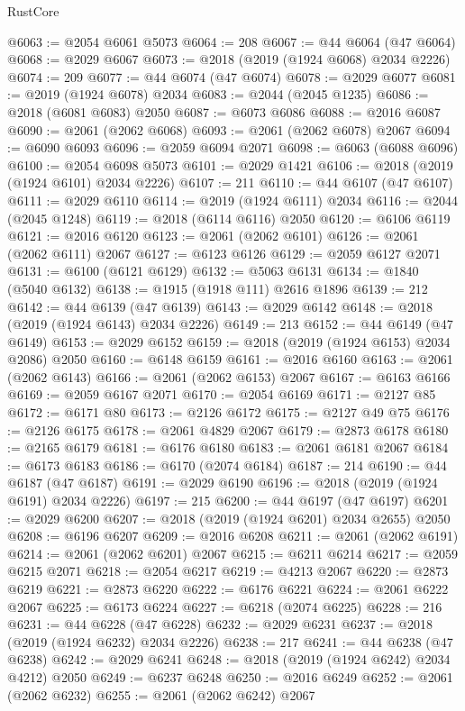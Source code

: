 \begin{lexlean}{RustCore}
\begin{coremodule}
@6063 := @2054 @6061 @5073
@6064 := 208
@6067 := @44 @6064 (@47 @6064)
@6068 := @2029 @6067
@6073 := @2018 (@2019 (@1924 @6068) @2034 @2226)
@6074 := 209
@6077 := @44 @6074 (@47 @6074)
@6078 := @2029 @6077
@6081 := @2019 (@1924 @6078) @2034
@6083 := @2044 (@2045 @1235)
@6086 := @2018 (@6081 @6083) @2050
@6087 := @6073 @6086
@6088 := @2016 @6087
@6090 := @2061 (@2062 @6068)
@6093 := @2061 (@2062 @6078) @2067
@6094 := @6090 @6093
@6096 := @2059 @6094 @2071
@6098 := @6063 (@6088 @6096)
@6100 := @2054 @6098 @5073
@6101 := @2029 @1421
@6106 := @2018 (@2019 (@1924 @6101) @2034 @2226)
@6107 := 211
@6110 := @44 @6107 (@47 @6107)
@6111 := @2029 @6110
@6114 := @2019 (@1924 @6111) @2034
@6116 := @2044 (@2045 @1248)
@6119 := @2018 (@6114 @6116) @2050
@6120 := @6106 @6119
@6121 := @2016 @6120
@6123 := @2061 (@2062 @6101)
@6126 := @2061 (@2062 @6111) @2067
@6127 := @6123 @6126
@6129 := @2059 @6127 @2071
@6131 := @6100 (@6121 @6129)
@6132 := @5063 @6131
@6134 := @1840 (@5040 @6132)
@6138 := @1915 (@1918 @111) @2616 @1896
@6139 := 212
@6142 := @44 @6139 (@47 @6139)
@6143 := @2029 @6142
@6148 := @2018 (@2019 (@1924 @6143) @2034 @2226)
@6149 := 213
@6152 := @44 @6149 (@47 @6149)
@6153 := @2029 @6152
@6159 := @2018 (@2019 (@1924 @6153) @2034 @2086) @2050
@6160 := @6148 @6159
@6161 := @2016 @6160
@6163 := @2061 (@2062 @6143)
@6166 := @2061 (@2062 @6153) @2067
@6167 := @6163 @6166
@6169 := @2059 @6167 @2071
@6170 := @2054 @6169
@6171 := @2127 @85
@6172 := @6171 @80
@6173 := @2126 @6172
@6175 := @2127 @49 @75
@6176 := @2126 @6175
@6178 := @2061 @4829 @2067
@6179 := @2873 @6178
@6180 := @2165 @6179
@6181 := @6176 @6180
@6183 := @2061 @6181 @2067
@6184 := @6173 @6183
@6186 := @6170 (@2074 @6184)
@6187 := 214
@6190 := @44 @6187 (@47 @6187)
@6191 := @2029 @6190
@6196 := @2018 (@2019 (@1924 @6191) @2034 @2226)
@6197 := 215
@6200 := @44 @6197 (@47 @6197)
@6201 := @2029 @6200
@6207 := @2018 (@2019 (@1924 @6201) @2034 @2655) @2050
@6208 := @6196 @6207
@6209 := @2016 @6208
@6211 := @2061 (@2062 @6191)
@6214 := @2061 (@2062 @6201) @2067
@6215 := @6211 @6214
@6217 := @2059 @6215 @2071
@6218 := @2054 @6217
@6219 := @4213 @2067
@6220 := @2873 @6219
@6221 := @2873 @6220
@6222 := @6176 @6221
@6224 := @2061 @6222 @2067
@6225 := @6173 @6224
@6227 := @6218 (@2074 @6225)
@6228 := 216
@6231 := @44 @6228 (@47 @6228)
@6232 := @2029 @6231
@6237 := @2018 (@2019 (@1924 @6232) @2034 @2226)
@6238 := 217
@6241 := @44 @6238 (@47 @6238)
@6242 := @2029 @6241
@6248 := @2018 (@2019 (@1924 @6242) @2034 @4212) @2050
@6249 := @6237 @6248
@6250 := @2016 @6249
@6252 := @2061 (@2062 @6232)
@6255 := @2061 (@2062 @6242) @2067

\end{coremodule}
\end{lexlean}
